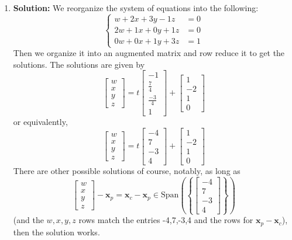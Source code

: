 \documentclass[letterpaper,12pt]{article}
\newcommand{\set}[1]{\left\{ #1 \right\}}
\theoremstyle{definition}
\begin{document}
\begin{enumerate}
    \item[] \begin{mdframed}
        \textbf{Solution:}
        We reorganize the system of equations into the following:
        $$\begin{cases}
    w + 2x + 3y - 1z &= 0 \\
    2w + 1x + 0y + 1z &= 0 \\
    0w + 0x + 1y+ 3z &= 1
\end{cases}$$
Then we organize it into an augmented matrix and row reduce it to get the solutions. The solutions are given by
$$\begin{bmatrix}
    w \\ x \\ y \\ z
\end{bmatrix} = t\begin{bmatrix}
    -1 \\ \frac{7}{4} \\ \frac{-3}{4} \\ 1
\end{bmatrix}+\begin{bmatrix}
    1 \\ -2 \\ 1 \\ 0
\end{bmatrix}$$
or equivalently,
$$\begin{bmatrix}
    w \\ x \\ y \\ z
\end{bmatrix} = t\begin{bmatrix}
    -4 \\ 7 \\ -3 \\ 4
\end{bmatrix}+\begin{bmatrix}
    1 \\ -2 \\ 1 \\ 0
\end{bmatrix}$$
There are other possible solutions of course, notably, as long as $$\begin{bmatrix}
    w \\ x \\ y \\ z
\end{bmatrix}- \mathbf{x}_p = \mathbf{x}_c - \mathbf{x}_p \in \mathrm{Span} \left (\set{\begin{bmatrix}
    -4 \\ 7 \\ -3 \\ 4
\end{bmatrix}} \right )$$ (and the $w,x,y,z$ rows match the entries -4,7,-3,4 and the rows for $\mathbf{x}_p - \mathbf{x}_c$), then the solution works.
    \end{mdframed}
\end{enumerate}
\end{document}
